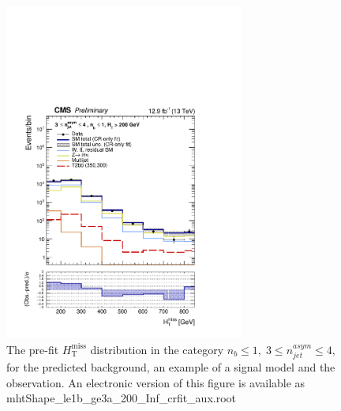 \clearpage
\begin{figure}[tbhp]
    \caption{ 
    The pre-fit $H_{\mathrm{T}}^{\mathrm{miss}}$ distribution in the category $n_{b}\leq 1, \; 3 \leq n_{jet}^{asym} \leq 4$, 
    for the predicted background, an example of a signal model and the observation.
    An electronic version of this figure is available as mhtShape\_le1b\_ge3a\_200\_Inf\_crfit\_aux.root
    \label{fig:mhtShape_le1b_ge3a_crfit} }
  \begin{center}
  \includegraphics[width=0.7\textwidth]{mhtShape_le1b_ge3a_200_Inf_crfit_aux}
  \end{center}
\end{figure}


